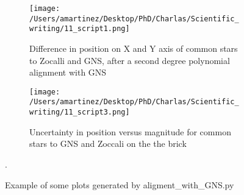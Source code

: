 \documentclass[4paper,11pt]{report}
\begin{document}
\begin{figure}
	\begin{subfigure}[b]{\textwidth}
		\texttt{[image: /Users/amartinez/Desktop/PhD/Charlas/Scientific\_writing/11\_script1.png]}
		\caption{Difference in position on X and Y axis of common stars to Zocalli and GNS, after a second degree polynomial alignment with GNS}
	\end{subfigure}
	\begin{subfigure}[b]{\textwidth}
		\texttt{[image: /Users/amartinez/Desktop/PhD/Charlas/Scientific\_writing/11\_script3.png]}		
			\caption{Uncertainty in position versus magnitude for common stars to GNS and Zoccali on the the brick}
	\end{subfigure}
	\captionsetup{justification=centering}
	\caption{Example of some plots generated by aligment\_with\_GNS.py }.
	\label{fig8:11_script}
\end{figure}
\end{document}
